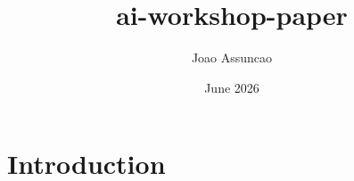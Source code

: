 \documentclass{article}
\title{ai-workshop-paper}
\author{Joao Assuncao}
\date{June 2026}
\begin{document}
\maketitle

\section{Introduction}
\end{document}
